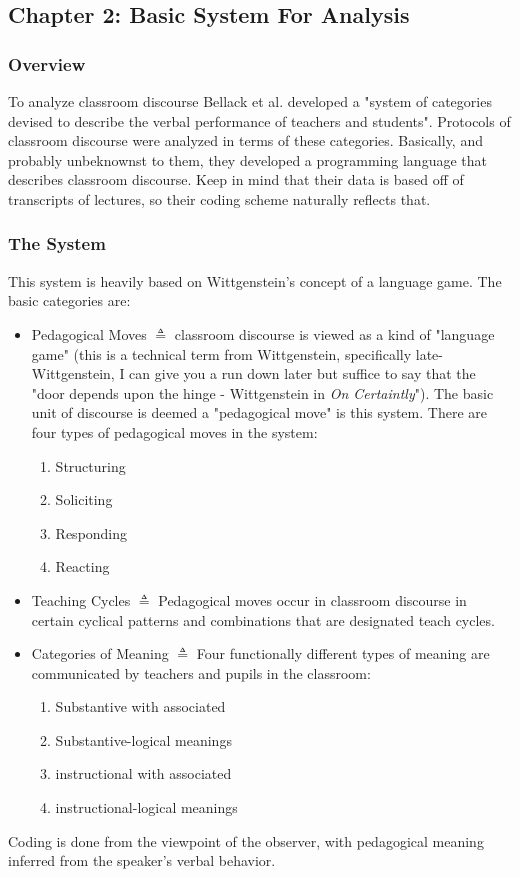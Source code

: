 \documentclass[10pt, letterpaper]{article}
\begin{document}
\subsection*{Chapter 2: Basic System For Analysis}
\label{sec:orgc0b6830}

\subsubsection*{Overview}
\label{sec:orga087562}
To analyze classroom discourse Bellack et al. developed a "system of categories devised to describe the verbal performance of teachers and students". Protocols of classroom discourse were analyzed in terms of these categories. Basically, and probably unbeknownst to them, they developed a programming language that describes classroom discourse. Keep in mind that their data is based off of transcripts of lectures, so their coding scheme naturally reflects that.
\subsubsection*{The System}
\label{sec:org9cd4ef1}
This system is heavily based on Wittgenstein's concept of a language game. The basic categories are:
\begin{itemize}
\item Pedagogical Moves \(\triangleq\) classroom discourse is viewed as a kind of "language game" (this is a technical term from Wittgenstein, specifically late-Wittgenstein, I can give you a run down later but suffice to say that the "door depends upon the hinge - Wittgenstein in \emph{On Certaintly}"). The basic unit of discourse is deemed a "pedagogical move" is this system. There are four types of pedagogical moves in the system:
\begin{enumerate}
\item Structuring
\item Soliciting
\item Responding
\item Reacting
\end{enumerate}
\item Teaching Cycles \(\triangleq\) Pedagogical moves occur in classroom discourse in certain cyclical patterns and combinations that are designated teach cycles.
\item Categories of Meaning \(\triangleq\) Four functionally different types of meaning are communicated by teachers and pupils in the classroom:
\begin{enumerate}
\item Substantive with associated
\item Substantive-logical meanings
\item instructional with associated
\item instructional-logical meanings
\end{enumerate}
\end{itemize}
Coding is done from the viewpoint of the observer, with pedagogical meaning inferred from the speaker's verbal behavior. 
\end{document}
